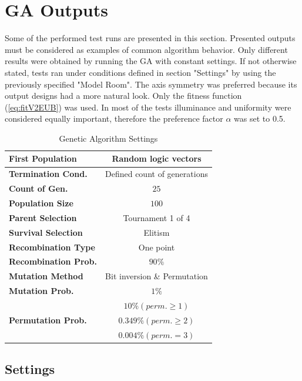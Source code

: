 \section{GA Outputs}

Some of the performed test runs are presented in this section. Presented outputs must be considered as examples of common algorithm behavior. Only different results were obtained by running the GA with constant settings. If not otherwise stated, tests ran under conditions defined in section "Settings" by using the previously specified "Model Room". The axis symmetry was preferred because its output designs had a more natural look. Only the fitness function (\ref{eq:fitV2EUB}) was used. In most of the tests illuminance and uniformity were considered equally important, therefore the preference factor $\alpha$ was set to 0.5.

\begin{table}[bt]
	\renewcommand{\arraystretch}{1.3}
	\caption{Genetic Algorithm Settings}
 	\label{tab:GAsettings}
	\centering
  \begin{tabular}{| l | c |}
    \hline
    \textbf{First Population} & Random logic vectors \\
    \hline
    \textbf{Termination Cond.} & Defined count of generations \\
    \hline
		\textbf{Count of Gen.} & $25$ \\
    \hline
		\textbf{Population Size} & $100$ \\
	\hline
		\textbf{Parent Selection} & Tournament 1 of 4 \\
    \hline
		\textbf{Survival Selection} & Elitism \\
	\hline
		\textbf{Recombination Type} & One point \\
    \hline
		\textbf{Recombination Prob.} & $90 \%$ \\
	\hline
		\textbf{Mutation Method} & Bit inversion \& Permutation\\
	\hline
		\textbf{Mutation Prob.} & $1 \%$ \\
	\hline
		& $10 \% \left( perm. \geq 1\right)$\\
		\textbf{Permutation Prob.} &  $0.349 \% \left( perm. \geq 2\right)$ \\
		&$0.004 \% \left( perm. = 3\right)$\\
    \hline
  \end{tabular}
\end{table}

\subsection{Settings}

